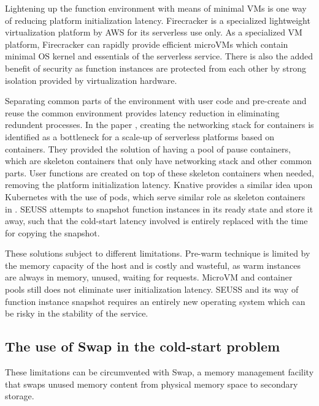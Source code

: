 \documentclass[conference]{IEEEtran}
\begin{document}
Lightening up the function environment with means of minimal VMs is one way of reducing platform initialization latency.\cite{agacheFirecrackerLightweightVirtualization2020,mancoMyVMLighter2017} Firecracker is a specialized lightweight virtualization platform by AWS for its serverless use only\cite{agacheFirecrackerLightweightVirtualization2020}. As a specialized VM platform, Firecracker can rapidly provide efficient microVMs which contain minimal OS kernel and essentials of the serverless service. There is also the added benefit of security as function instances are protected from each other by strong isolation provided by virtualization hardware.

Separating common parts of the environment with user code and pre-create and reuse the common environment provides latency reduction in eliminating redundent processes. \cite{mohanAgileColdStarts2019,caddenSEUSSSkipRedundant2020,linMitigatingColdStarts2019} In the paper \cite{mohanAgileColdStarts2019}, creating the networking stack for containers is identified as a bottleneck for a scale-up of serverless platforms based on containers. They provided the solution of having a pool of pause containers, which are skeleton containers that only have networking stack and other common parts. User functions are created on top of these skeleton containers when needed, removing the platform initialization latency. Knative \cite{linMitigatingColdStarts2019} provides a similar idea upon Kubernetes with the use of pods, which serve similar role as skeleton containers in \cite{mohanAgileColdStarts2019}. SEUSS \cite{caddenSEUSSSkipRedundant2020} attempts to snapshot function instances in its ready state and store it away, such that the cold-start latency involved is entirely replaced with the time for copying the snapshot.

These solutions subject to different limitations. Pre-warm technique is limited by the memory capacity of the host and is costly and wasteful, as warm instances are always in memory, unused, waiting for requests. MicroVM and container pools still does not eliminate user initialization latency. SEUSS and its way of function instance snapshot requires an entirely new operating system which can be risky in the stability of the service.

\subsection{The use of Swap in the cold-start problem}
These limitations can be circumvented with Swap, a memory management facility that swaps unused memory content from physical memory space to secondary storage. 
\end{document}
